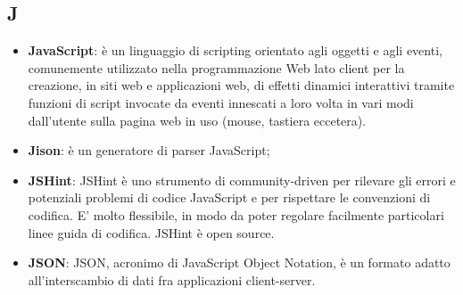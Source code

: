 \subsection{J}
\begin{itemize} 
	\item
	\textbf{JavaScript}: è un linguaggio di scripting orientato agli oggetti e agli eventi, comunemente utilizzato nella programmazione Web lato client per la creazione, in siti web e applicazioni web, di effetti dinamici interattivi tramite funzioni di script invocate da eventi innescati a loro volta in vari modi dall'utente sulla pagina web in uso (mouse, tastiera eccetera).
	\item
	\textbf{Jison}: è un generatore di parser JavaScript;
	\item
	\textbf{JSHint}: JSHint è uno strumento di community-driven per rilevare gli errori e potenziali problemi di codice JavaScript e per rispettare le convenzioni di codifica. E' molto flessibile, in modo da poter regolare facilmente particolari linee guida di codifica. JSHint è open source.
	\item
	\textbf{JSON}: JSON, acronimo di JavaScript Object Notation, è un formato adatto all'interscambio di dati fra applicazioni client-server.
\end{itemize}